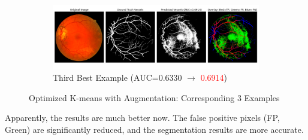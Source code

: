 \documentclass[12pt,letterpaper]{article}
\begin{document}
\begin{figure}[H]
    \ContinuedFloat
    \centering
    \begin{subfigure}[H]{\textwidth}
        \centering
        \includegraphics[scale=0.35]{Figures/4 Optimized 3rd.png}
        \vspace{-0.5cm}
        \caption{Third Best Example (AUC=0.6330 $\rightarrow$ \textcolor{red}{0.6914})}
        \label{fig:opt_aug3}
    \end{subfigure}
    \caption{Optimized K-means with Augmentation: Corresponding 3 Examples}
    \label{fig:opt_aug}
\end{figure}
\noindent
Apparently, the results are much better now. The false positive pixels (FP, Green) are significantly reduced, and the segmentation results are more accurate. 
\end{document}
